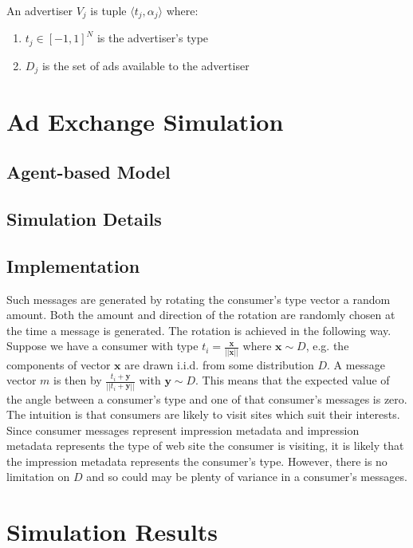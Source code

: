 \documentclass{article}
\begin{document}
An advertiser $V_j$ is tuple $\langle t_j, \alpha_j \rangle$ where:

\begin{enumerate}
	\item $t_j \in [-1,1]^N$ is the advertiser's type
	\item $D_j$ is the set of ads available to the advertiser
\end{enumerate}

\newpage

\section{Ad Exchange Simulation}

\subsection{Agent-based Model}

\subsection{Simulation Details}

\subsection{Implementation}

Such messages are generated by rotating the consumer's type vector a random amount. Both the amount and direction of the rotation are randomly chosen at the time a message is generated. The rotation is achieved in the following way. Suppose we have a consumer with type $t_i = \frac{\bm{x}}{||\bm{x}||}$ where $\bm{x} \sim D$, e.g. the components of vector $\bm{x}$ are drawn i.i.d. from some distribution $D$. A message vector $m$ is then by $\frac{t_i + \bm{y}}{||t_i + \bm{y}||}$ with $\bm{y} \sim D$. This means that the expected value of the angle between a consumer's type and one of that consumer's messages is zero. The intuition is that consumers are likely to visit sites which suit their interests. Since consumer messages represent impression metadata and impression metadata represents the type of web site the consumer is visiting, it is likely that the impression metadata represents the consumer's type. However, there is no limitation on $D$ and so could may be plenty of variance in a consumer's messages.

\newpage

\section{Simulation Results}
\end{document}
